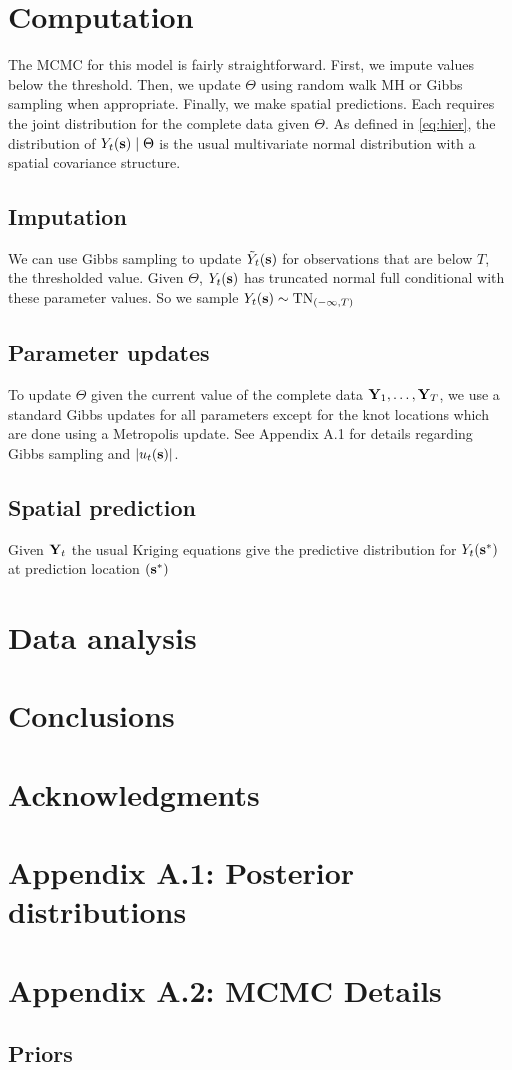 \documentclass[11pt]{article}
\begin{document}
\section{Computation}\label{s:comp}
The MCMC for this model is fairly straightforward.
First, we impute values below the threshold.
Then, we update $\Theta$ using random walk MH or Gibbs sampling when appropriate.
Finally, we make spatial predictions.
Each requires the joint distribution for the complete data given $\Theta$.
As defined in \ref{eq:hier}, the distribution of $Y_t(\mbox{\bf s}) \mid \Theta$ is the usual multivariate normal distribution with a \Matern spatial covariance structure.

\subsection{Imputation}\label{s:impute}
We can use Gibbs sampling to update ${\tilde Y}_t(\mbox{\bf s})$ for observations that are below $T$, the thresholded value. Given $\Theta$, $Y_t(\mbox{\bf s})$ has truncated normal full conditional with these parameter values.
So we sample $Y_t(\mbox{\bf s}) \sim \text{TN}_{(-\infty, T)}$

\subsection{Parameter updates}\label{s:params}
To update $\Theta$ given the current value of the complete data $\mbox{\bf Y}_1, \ldots, \mbox{\bf Y}_T$, we use a standard Gibbs updates for all parameters except for the knot locations which are done using a Metropolis update.
See Appendix A.1 for details regarding Gibbs sampling and $|u_t(\mbox{\bf s})|$.

\subsection{Spatial prediction}\label{s:pred}
Given $\mbox{\bf Y}_t$ the usual Kriging equations give the predictive distribution for $Y_t(\mbox{\bf s}^*)$ at prediction location $(\mbox{\bf s}^*)$


\section{Data analysis}\label{s:analysis}


\section{Conclusions}\label{s:con}

\section*{Acknowledgments}

\section*{Appendix A.1: Posterior distributions}



\section*{Appendix A.2: MCMC Details}

\subsection*{Priors}





\end{document}
